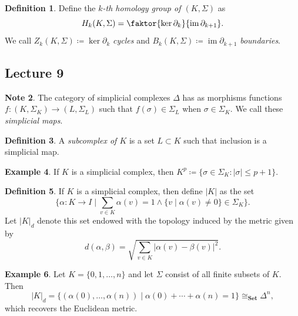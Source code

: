 \documentclass[10pt,letterpaper,cm]{nupset}
\theoremstyle{definition}
\newtheorem{definition}{Definition}[subsection]
\newtheorem{exmp}[definition]{Example}
\newtheorem{note}[definition]{Note}
\theoremstyle{theorem}
\theoremstyle{remark}
\newcommand{\1}{\mathbb{1}}
\newcommand{\0}{\vec 0}
\DeclareMathOperator{\im}{im}
\begin{document}
\begin{definition}
Define the \textit{$k$-th homology group of $(K , \Sigma)$} as $$H_k(K, \Sigma) = \faktor{\ker{\partial_k}}{\im{\partial_{k+1}}}.$$ We call $Z_k(K, \Sigma)\coloneqq  \ker{\partial_k}$ \textit{cycles} and $B_k(K, \Sigma)\coloneqq  \im{\partial_{k+1}}$ \textit{boundaries}.
\end{definition}

\subsection{Lecture 9}

\begin{note}
The category of simplicial complexes $\Delta$ has as morphisms functions $f: (K, \Sigma_K) \to (L, \Sigma_L)$ such that $f(\sigma) \in \Sigma_L$ when $\sigma \in \Sigma_K$. We call these \textit{simplicial maps}.
\end{note}

\begin{definition}
A \textit{subcomplex of $K$} is a set $L \subset K$ such that inclusion is a simplicial map.
\end{definition}

\begin{exmp}
If $K$ is a simplicial complex, then $K^p \coloneqq  \{\sigma \in \Sigma_K : |\sigma| \leq p+1\}$.
\end{exmp}

\begin{definition}
If $K$ is a simplicial complex, then define $|K|$ as the set $$\{\alpha : K \to I \mid \sum_{v\in K} \alpha(v)=1 \land \{v \mid \alpha(v) \ne 0\} \in \Sigma_K \}.$$ Let $|K|_d$ denote this set endowed with the topology induced by the metric given by $$d(\alpha, \beta) = \sqrt{\sum_{v\in K} |\alpha(v) -\beta(v)|^2} .$$
\end{definition}

\begin{exmp}
Let  $K= \{0, 1, \ldots, n\}$ and let $\Sigma$ consist of all finite subsets of $K$. Then $$|K|_d = \{ (\alpha(0), \ldots, \alpha(n)) \mid \alpha(0) + \cdots + \alpha(n) = 1\} \cong_{\mathbf{Set}} \Delta^n,$$ which recovers the Euclidean metric. 
\end{exmp}
\end{document}
